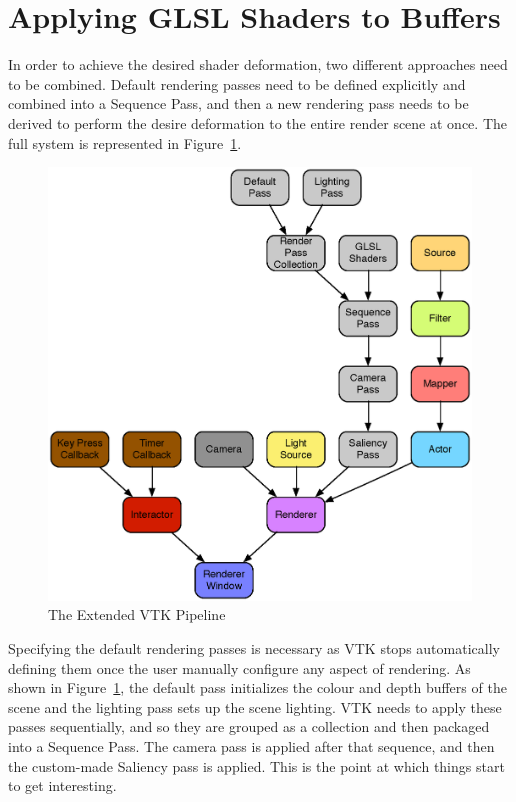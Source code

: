 \documentclass[MSc,paper=a4,pagesize=auto]{icldt}
\begin{document}
\section{Applying GLSL Shaders to Buffers}
In order to achieve the desired shader deformation, two different approaches need to be combined. Default rendering passes need to be defined explicitly and combined into a Sequence Pass, and then a new rendering pass needs to be derived to perform the desire deformation to the entire render scene at once. The full system is represented in Figure~\ref{fig:vtk_extended_pipeline}.

\begin{figure}[htbp!]
    \centering
    \includegraphics[width=1\textwidth]{resources/vtk_extended_pipeline}
    \caption{The Extended VTK Pipeline}
    \label{fig:vtk_extended_pipeline}
\end{figure}

Specifying the default rendering passes is necessary as VTK stops automatically defining them once the user manually configure any aspect of rendering. As shown in Figure~\ref{fig:vtk_extended_pipeline}, the default pass initializes the colour and depth buffers of the scene and the lighting pass sets up the scene lighting. VTK needs to apply these passes sequentially, and so they are grouped as a collection and then packaged into a Sequence Pass. The camera pass is applied after that sequence, and then the custom-made Saliency pass is applied. This is the point at which things start to get interesting.
\end{document}
